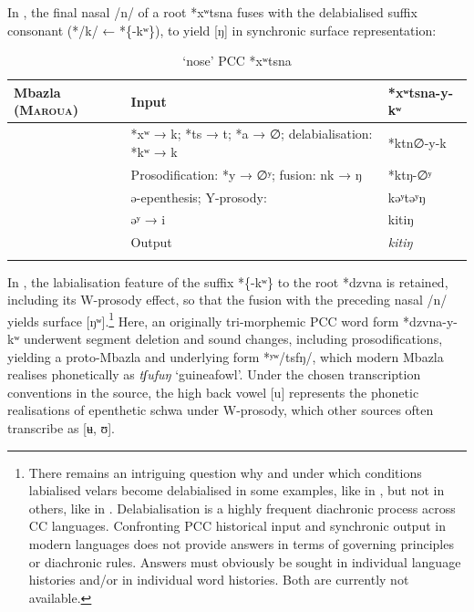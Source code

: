 \documentclass[output=paper]{langscibook}
\begin{document}
In , the final nasal /n/ of a root *xʷtsna fuses with the delabialised suffix consonant (*/k/ ← *\{-kʷ\}), to yield [ŋ] in synchronic surface representation:

\begin{table}
\caption{‘nose’ PCC *xʷtsna}
\label{extab:wolff:14}
\small

\begin{tabularx}{\textwidth}{l@{~~}ll@{}}
\lsptoprule
  Mbazla (\textsc{Maroua}) & Input                      & *xʷtsna-y-kʷ\\
  \midrule
                           &*xʷ → k;
                             *ts → t; *a → ∅;
                            delabialisation: *kʷ → k    & *ktn∅-y-k\\
                        & Prosodification:  *y → ∅ʸ;
                            fusion: nk → ŋ              & *ktŋ-∅ʸ\\
                        &  ə-epenthesis;     Y-prosody: & kəʸtəʸŋ \\
                        &  əʸ → i                           & kitiŋ \\
                        \midrule
                        & Output & \textit{kitiŋ}\\
\lspbottomrule
\end{tabularx}


\end{table}

In , the labialisation feature of the suffix *\{-kʷ\} to the root *dzvna is retained, including its W-prosody effect, so that the fusion with the preceding nasal /n/ yields surface [ŋʷ].\footnote{There remains an intriguing question why and under which conditions labialised velars become delabialised in some examples, like in , but not in others, like in . Delabialisation is a highly frequent diachronic process across CC languages. Confronting PCC historical input and synchronic output in modern languages does not provide answers in terms of governing principles or diachronic rules. Answers must obviously be sought in individual language histories and/or in individual word histories. Both are currently not available.}  Here, an originally tri-morphemic PCC word form *dzvna-y-kʷ underwent segment deletion and sound changes, including prosodifications, yielding a proto-Mbazla and underlying form *ʸʷ/tsfŋ/, which modern Mbazla realises phonetically as \textit{tʃufuŋ} ‘guineafowl’. Under the chosen transcription conventions in the source, the high back vowel [u] represents the phonetic realisations of epenthetic schwa under W-prosody, which other sources often transcribe as [ʉ, ʊ].
\end{document}
